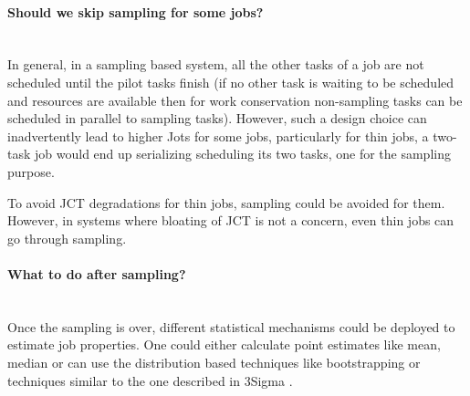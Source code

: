 \paragraph{Should we skip sampling for some jobs?} \\
In general, in a sampling based system, all the other tasks of a job are not
scheduled until the pilot tasks finish (if no other task is waiting to be
scheduled and resources are available then for work conservation non-sampling
tasks can be scheduled in parallel to sampling tasks). However, such a design
choice can inadvertently lead to higher Jots for some jobs, particularly for
thin jobs, \eg a two-task job would end up serializing scheduling its two
tasks, one for the sampling purpose.

To avoid JCT degradations for thin jobs, sampling could be avoided for them.
However, in systems where bloating of JCT is not a concern, even thin jobs can
go through sampling.

\paragraph{What to do after sampling?} \\
Once the sampling is over, different statistical mechanisms could be deployed
to estimate job properties.  One could either calculate point estimates like
mean, median or can use the distribution based techniques like
bootstrapping or techniques similar to the one described in 3Sigma \cite{3Sigma}.

\fi



